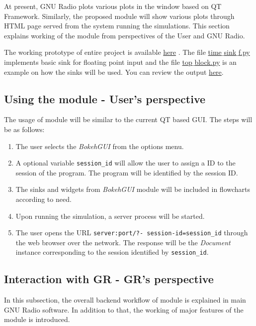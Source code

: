 \documentclass[a4paper, 11pt]{article}
\begin{document}
At present, GNU Radio plots various plots in the window based on QT Framework. Similarly, the proposed module will show various plots through HTML page served from the system running the simulations. This section explains working of the module from perspectives of the User and GNU Radio.

The working prototype of entire project is available \href{https://github.com/kartikp1995/gr-htmlgui/}{here} \cite{htmlGui}. The file \href{https://github.com/kartikp1995/gr-htmlgui/blob/master/python/time_sink_f.py}{time$\_$sink$\_$f.py} implements basic sink for floating point input and the file \href{https://github.com/kartikp1995/gr-htmlgui/blob/master/examples/top_block.py}{top$\_$block.py} is an example on how the sinks will be used. You can review the output \href{http://terminal.kartikpatel.in:5006/?bokeh-session-id=ARfUOyu0urukFhh3TmXRqHari59Bo1w2O4GGnseztvCL}{here}.

\subsection{Using the module - User's perspective}
The usage of module will be similar to the current QT based GUI. The steps will be as follows:
\begin{enumerate}
\item The user selects the \textit{BokehGUI} from the options menu. 
\item A optional variable \texttt{session\_id} will allow the user to assign a ID to the session of the program. The program will be identified by the session ID.
\item The sinks and widgets from \textit{BokehGUI} module will be included in flowcharts according to need.
\item Upon running the simulation, a server process will be started.
\item The user opens the URL \texttt{server:port/?- }\texttt{session-id=session\_id} through the web browser over the network. The response will be the \textit{Document} instance corresponding to the session identified by \texttt{session\_id}.
\end{enumerate}

\subsection{Interaction with GR - GR's perspective}
In this subsection, the overall backend workflow of module is explained in main GNU Radio software. In addition to that, the working of major features of the module is introduced.
\end{document}
